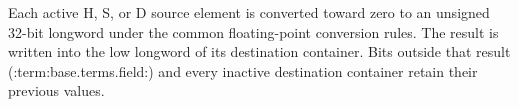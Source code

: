 Each active H, S, or D source element is converted toward zero to an unsigned
32-bit longword under the common floating-point conversion rules. The result
is written into the low longword of its destination container. Bits outside
that result (:term:base.terms.field:) and every inactive destination container retain their
previous values.
